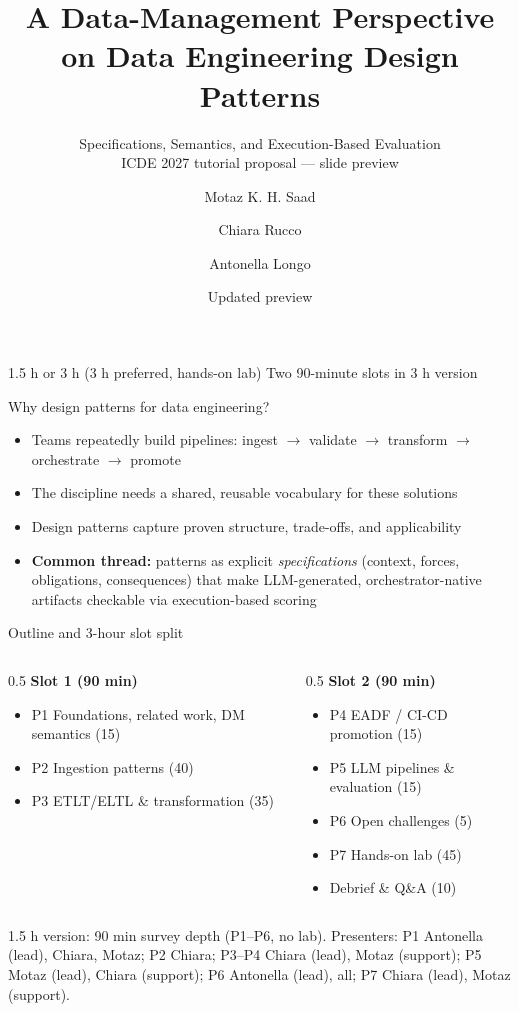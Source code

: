 \documentclass[aspectratio=169]{beamer}
\title{A Data-Management Perspective on Data Engineering Design Patterns}
\subtitle{Specifications, Semantics, and Execution-Based Evaluation\\ICDE 2027 tutorial proposal --- slide preview}
\author{Motaz K. H. Saad \and Chiara Rucco \and Antonella Longo}
\institute{DataLab, Dept.\ of Engineering for Innovation, University of Salento}
\date{Updated preview}
\begin{document}
\begin{frame}
  \titlepage
  \vspace{0.3em}
  \small 1.5 h or 3 h (3 h preferred, hands-on lab) \quad \textbullet \quad Two 90-minute slots in 3 h version
\end{frame}

\begin{frame}{Why design patterns for data engineering?}
  \begin{itemize}
    \item Teams repeatedly build pipelines: ingest $\rightarrow$ validate $\rightarrow$ transform $\rightarrow$ orchestrate $\rightarrow$ promote
    \item The discipline needs a shared, reusable vocabulary for these solutions
    \item Design patterns capture proven structure, trade-offs, and applicability
    \item \textbf{Common thread:} patterns as explicit \emph{specifications} (context, forces, obligations, consequences) that make LLM-generated, orchestrator-native artifacts checkable via execution-based scoring
  \end{itemize}
\end{frame}

\begin{frame}{Outline and 3-hour slot split}
  \small
  \begin{columns}[T]
    \begin{column}{0.5\textwidth}
      \textbf{Slot 1 (90 min)}
      \begin{itemize}
        \item P1 Foundations, related work, DM semantics (15)
        \item P2 Ingestion patterns (40)
        \item P3 ETLT/ELTL \& transformation (35)
      \end{itemize}
    \end{column}
    \begin{column}{0.5\textwidth}
      \textbf{Slot 2 (90 min)}
      \begin{itemize}
        \item P4 EADF / CI-CD promotion (15)
        \item P5 LLM pipelines \& evaluation (15)
        \item P6 Open challenges (5)
        \item P7 Hands-on lab (45)
        \item Debrief \& Q\&A (10)
      \end{itemize}
    \end{column}
  \end{columns}
  \vspace{0.4em}
  \footnotesize 1.5 h version: 90 min survey depth (P1--P6, no lab). Presenters: P1 Antonella (lead), Chiara, Motaz; P2 Chiara; P3--P4 Chiara (lead), Motaz (support); P5 Motaz (lead), Chiara (support); P6 Antonella (lead), all; P7 Chiara (lead), Motaz (support).
\end{frame}
\end{document}
